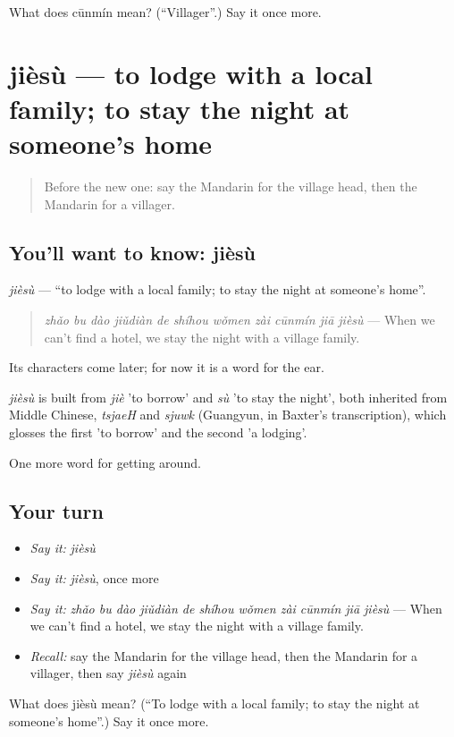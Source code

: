 \begin{tcolorbox}[breakable,colback=teal!4,colframe=teal!35!black,title={Before you move on}]
What does cūnmín mean? (\textquotedblleft{}Villager\textquotedblright{}.) Say it once more.
\end{tcolorbox}
\section[jièsù]{jièsù — to lodge with a local family; to stay the night at someone's home}

\label{lesson:ZH-C440-jiesu}



\begin{quote}
Before the new one: say the Mandarin for the village head, then the Mandarin for a villager.
\end{quote}

\subsection*{You'll want to know: jièsù}
\emph{jièsù} — \textquotedblleft{}to lodge with a local family; to stay the night at someone's home\textquotedblright{}.

\begin{quote}
\emph{zhǎo bu dào jiǔdiàn de shíhou wǒmen zài cūnmín jiā jièsù} — When we can't find a hotel, we stay the night with a village family.
\end{quote}

Its characters come later; for now it is a word for the ear.

\begin{cousinweb}
\emph{jièsù} is built from \emph{jiè} 'to borrow' and \emph{sù} 'to stay the night', both inherited from Middle Chinese, \emph{tsjaeH} and \emph{sjuwk} (Guangyun, in Baxter's transcription), which glosses the first 'to borrow' and the second 'a lodging'.
\end{cousinweb}

\begin{grammarlens}[title={What you've built}]
One more word for getting around.
\end{grammarlens}

\subsection*{Your turn}
\begin{itemize}
\raggedright
  \item \emph{Say it:} \emph{jièsù}
  \item \emph{Say it:} \emph{jièsù}, once more
  \item \emph{Say it:} \emph{zhǎo bu dào jiǔdiàn de shíhou wǒmen zài cūnmín jiā jièsù} — When we can't find a hotel, we stay the night with a village family.
  \item \emph{Recall:} say the Mandarin for the village head, then the Mandarin for a villager, then say \emph{jièsù} again
\end{itemize}

\begin{tcolorbox}[breakable,colback=teal!4,colframe=teal!35!black,title={Before you move on}]
What does jièsù mean? (\textquotedblleft{}To lodge with a local family; to stay the night at someone's home\textquotedblright{}.) Say it once more.
\end{tcolorbox}
